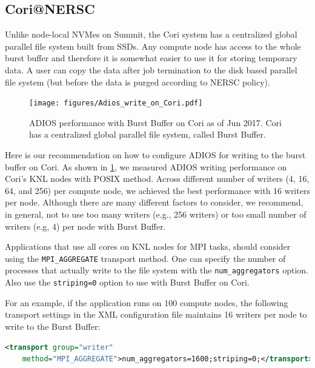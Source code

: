 \subsection{Cori@NERSC}

Unlike node-local NVMes on Summit, the Cori system has a centralized global parallel file system built from SSDs. Any compute node has access to the whole burst buffer and therefore it is somewhat easier to use it for storing temporary data. A user can copy the data after job termination to the disk based parallel file system (but before the data is purged according to NERSC policy).

\begin{figure}
\center
\texttt{[image: figures/Adios\_write\_on\_Cori.pdf]}
\caption{ADIOS performance with Burst Buffer on Cori as of Jun 2017. Cori has a centralized global parallel file system, called Burst Buffer.}
\label{fig:cori}
\end{figure}

Here is our recommendation on how to configure ADIOS for writing to the burst buffer on Cori.
As shown in \ref{fig:cori}, we measured ADIOS writing performance on Cori's KNL nodes with POSIX method. Across different number of writers (4, 16, 64, and 256) per compute node, we achieved the best performance with 16 writers per node. Although there are many different factors to consider, we recommend, in general, not to use too many writers (e.g., 256 writers) or too small number of writers (e.g, 4) per node with Burst Buffer.

Applications that use all cores on KNL nodes for MPI tasks, should consider using the \verb+MPI_AGGREGATE+ transport method. One can specify the number of processes that actually write to the file system with the \verb+num_aggregators+ option. Also use the \verb+striping=0+ option to use with Burst Buffer on Cori. 

For an example, if the application runs on 100 compute nodes, the following transport settings in the XML configuration file maintains 16 writers per node to write to the Burst Buffer:
\begin{lstlisting}[language=XML]
<transport group="writer" 
	method="MPI_AGGREGATE">num_aggregators=1600;striping=0;</transport>
\end{lstlisting}



